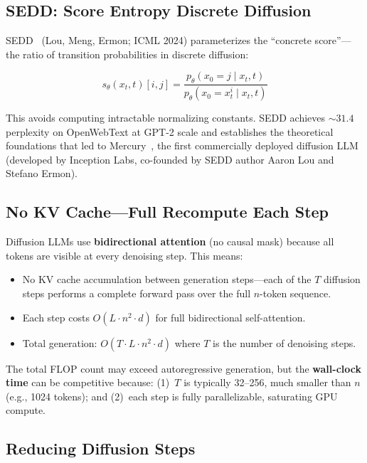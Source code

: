 \documentclass[11pt,letterpaper]{article}
\begin{document}
\subsection{SEDD: Score Entropy Discrete Diffusion}

SEDD~\cite{sedd} (Lou, Meng, Ermon; ICML 2024) parameterizes the ``concrete score''---the ratio of transition probabilities in discrete diffusion:

\begin{equation}
    s_\theta(x_t, t)[i, j] = \frac{p_\theta(x_0 = j \mid x_t, t)}{p_\theta(x_0 = x_t^i \mid x_t, t)}
    \label{eq:sedd-score}
\end{equation}

This avoids computing intractable normalizing constants. SEDD achieves ${\sim}31.4$ perplexity on OpenWebText at GPT-2 scale and establishes the theoretical foundations that led to Mercury~\cite{mercury}, the first commercially deployed diffusion LLM (developed by Inception Labs, co-founded by SEDD author Aaron Lou and Stefano Ermon).

\subsection{No KV Cache---Full Recompute Each Step}

Diffusion LLMs use \textbf{bidirectional attention} (no causal mask) because all tokens are visible at every denoising step. This means:

\begin{itemize}[noitemsep]
    \item No KV cache accumulation between generation steps---each of the $T$ diffusion steps performs a complete forward pass over the full $n$-token sequence.
    \item Each step costs $O(L \cdot n^2 \cdot d)$ for full bidirectional self-attention.
    \item Total generation: $O(T \cdot L \cdot n^2 \cdot d)$ where $T$ is the number of denoising steps.
\end{itemize}

The total FLOP count may exceed autoregressive generation, but the \textbf{wall-clock time} can be competitive because: (1)~$T$ is typically 32--256, much smaller than $n$ (e.g., 1024 tokens); and (2)~each step is fully parallelizable, saturating GPU compute.

\subsection{Reducing Diffusion Steps}
\end{document}
